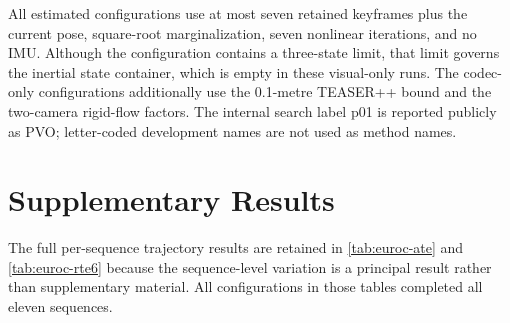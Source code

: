 \begin{table}[htbp]
  \centering
  \caption[Differences between evaluated configurations]{Parameters that differ between the reported estimated configurations.}
  \label{tab:appendix-config-differences}
\end{table}

All estimated configurations use at most seven retained keyframes plus the
current pose, square-root marginalization, seven nonlinear iterations, and no
IMU. Although the configuration contains a three-state limit, that limit
governs the inertial state container, which is empty in these visual-only runs.
The codec-only configurations additionally use the 0.1-metre TEASER++ bound and
the two-camera rigid-flow factors. The internal search label p01 is reported
publicly as PVO; letter-coded development names are not used as method names.

\chapter{Supplementary Results}\label{appendix:supplementary-results}

The full per-sequence trajectory results are retained in \autoref{tab:euroc-ate}
and \autoref{tab:euroc-rte6} because the sequence-level variation is a
principal result rather than supplementary material. All configurations in
those tables completed all eleven sequences.

